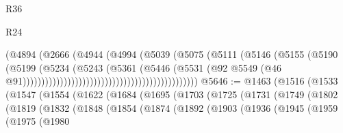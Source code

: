 \begin{lexlean}{R36}
\begin{lexlean}{R24}
\begin{coremodule}
{{{{{{{{{{{{{{{{{{{{{{{{{{{{{{{{{{{{{{{{{{{{{{{{{{{{{{{{{{{{{{{{{{{{{{{{{{{{{{{{{{{{{{{{{{{{{{{{{{{{{{{{{{{{{{{{{{{{{{{{{{{{{{{{{{{{{{{{{{{{{{{{{{{{{{{{{{{{{{{{{{{{{{{{{{{{{{{{{{{{{{{{{{{{{{{{{{{                                                              (@4894
                                                                (@2666
                                                                  (@4944
                                                                    (@4994
                                                                      (@5039
                                                                        (@5075
                                                                          (@5111
                                                                            (@5146
                                                                              (@5155
                                                                                (@5190
                                                                                  (@5199
                                                                                    (@5234
                                                                                      (@5243
                                                                                        (@5361
                                                                                          (@5446
                                                                                            (@5531
                                                                                              (@92
                                                                                                @5549
                                                                                                (@46
                                                                                                  @91)))))))))))))))))))))))))))))))))))))))))))))))
@5646 := @1463
    (@1516
      (@1533
        (@1547
          (@1554
            (@1622
              (@1684
                (@1695
                  (@1703
                    (@1725
                      (@1731
                        (@1749
                          (@1802
                            (@1819
                              (@1832
                                (@1848
                                  (@1854
                                    (@1874
                                      (@1892
                                        (@1903
                                          (@1936
                                            (@1945
                                              (@1959
                                                (@1975
                                                  (@1980
}}}}}}}}}}}}}}}}}}}}}}}}}}}}}}}}}}}}}}}}}}}}}}}}}}}}}}}}}}}}}}}}}}}}}}}}}}}}}}}}}}}}}}}}}}}}}}}}}}}}}}}}}}}}}}}}}}}}}}}}}}}}}}}}}}}}}}}}}}}}}}}}}}}}}}}}}}}}}}}}}}}}}}}}}}}}}}}}}}}}}}}}}}}}}}}}}}}
\end{coremodule}
\end{lexlean}
\end{lexlean}
